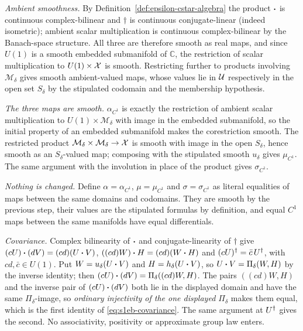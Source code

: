 \emph{Ambient smoothness.} By Definition~\ref{def:epsilon-cstar-algebra} the product
$\mathbin{\bm{\cdot}}$ is continuous complex-bilinear and $\dagger$ is continuous conjugate-linear (indeed
isometric); ambient scalar multiplication is continuous complex-bilinear by the
Banach-space structure. All three are therefore smooth as real maps, and since $U(1)$ is a
smooth embedded submanifold of $\mathbb C$, the restriction of scalar multiplication to
$U(1)\times\mathcal X$ is smooth. Restricting further to products involving
$\mathcal M_\delta$ gives smooth ambient-valued maps, whose values lie in $\mathcal U$
respectively in the open set $S_\delta$ by the stipulated codomain and the membership
hypothesis.

\emph{The three maps are smooth.} $\alpha_{C^{1}}$ is exactly the restriction of ambient
scalar multiplication to $U(1)\times\mathcal M_\delta$ with image in the embedded
submanifold, so the initial property of an embedded submanifold makes the corestriction
smooth. The restricted product $\mathcal M_\delta\times\mathcal M_\delta\to\mathcal X$ is smooth
with image in the open $S_\delta$, hence smooth as an $S_\delta$-valued map; composing with
the stipulated smooth $u_\delta$ gives $\mu_{C^{1}}$. The same argument with the involution
in place of the product gives $\sigma_{C^{1}}$.

\emph{Nothing is changed.} Define $\alpha=\alpha_{C^{1}}$, $\mu=\mu_{C^{1}}$ and
$\sigma=\sigma_{C^{1}}$ as literal equalities of maps between the same domains and
codomains. They are smooth by the previous step, their values are the stipulated formulas
by definition, and equal $C^{1}$ maps between the same manifolds have equal differentials.

\emph{Covariance.} Complex bilinearity of $\mathbin{\bm{\cdot}}$ and conjugate-linearity of $\dagger$ give
$(cU)\mathbin{\bm{\cdot}}(dV)=(cd)(U\mathbin{\bm{\cdot}} V)$, $((cd)W)\mathbin{\bm{\cdot}} H=(cd)(W\mathbin{\bm{\cdot}} H)$ and
$(cU)^{\dagger}=\bar c\,U^{\dagger}$, with $cd,\bar c\in U(1)$. Put $W=u_\delta(U\mathbin{\bm{\cdot}} V)$ and
$H=h_\delta(U\mathbin{\bm{\cdot}} V)$, so $U\mathbin{\bm{\cdot}} V=\Pi_\delta(W,H)$ by the inverse identity; then
$(cU)\mathbin{\bm{\cdot}}(dV)=\Pi_\delta((cd)W,H)$. The pairs $((cd)W,H)$ and the inverse pair of
$(cU)\mathbin{\bm{\cdot}}(dV)$ both lie in the displayed domain and have the same $\Pi_\delta$-image, so
\emph{ordinary injectivity of the one displayed $\Pi_\delta$} makes them equal, which is the
first identity of \eqref{eq:s1eb-covariance}. The same argument at $U^{\dagger}$ gives the second.
No associativity, positivity or approximate group law enters.

